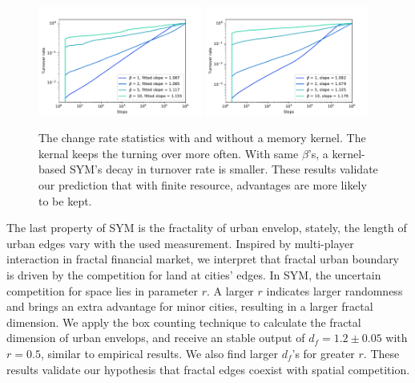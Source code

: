 \documentclass[reprint,unsortedaddress,amsmath,amssymb,aps,prl,showkeys]{revtex4-2}
\begin{document}
\begin{figure}
    \centering
    \includegraphics[width = 0.48\textwidth]{pics/with_mk.pdf}
    \includegraphics[width = 0.48\textwidth]{pics/without_mk.pdf}
    \caption{The change rate statistics with and without a memory kernel. The kernal keeps the turning over more often. With same $\beta$'s, a kernel-based SYM's decay in turnover rate is smaller. These results validate our prediction that with finite resource, advantages are more likely to be kept.}
    \label{changerate}
\end{figure}

The last property of SYM is the fractality of urban envelop, stately, the length of urban edges vary with the used measurement. Inspired by multi-player interaction in fractal financial market\cite{PhysRevE.65.037106}, we interpret that fractal urban boundary is driven by the competition for land at cities' edges. In SYM, the uncertain competition for space lies in parameter $r$. A larger $r$ indicates larger randomness and brings an extra advantage for minor cities, resulting in a larger fractal dimension. We apply the box counting technique to calculate the fractal dimension of urban envelops, and receive an stable output of $d_f = 1.2\pm 0.05$ with $r = 0.5$, similar to empirical results\cite{batty1992form}. We also find larger $d_f$'s for greater $r$. These results validate our hypothesis that fractal edges coexist with spatial competition. 

\end{document}
